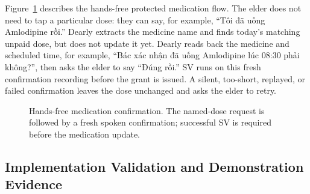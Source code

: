 Figure~\ref{fig:protected-flow} describes the hands-free protected medication flow. The elder does not need to tap a particular dose: they can say, for example, ``Tôi đã uống Amlodipine rồi.'' Dearly extracts the medicine name and finds today's matching unpaid dose, but does not update it yet. Dearly reads back the medicine and scheduled time, for example, ``Bác xác nhận đã uống Amlodipine lúc 08:30 phải không?'', then asks the elder to say ``Đúng rồi.'' SV runs on this fresh confirmation recording before the grant is issued. A silent, too-short, replayed, or failed confirmation leaves the dose unchanged and asks the elder to retry.

\begin{figure}[H]
\centering
{}
\caption{Hands-free medication confirmation. The named-dose request is followed by a fresh spoken confirmation; successful SV is required before the medication update.}
\label{fig:protected-flow}
\end{figure}

\subsection{Implementation Validation and Demonstration Evidence}

